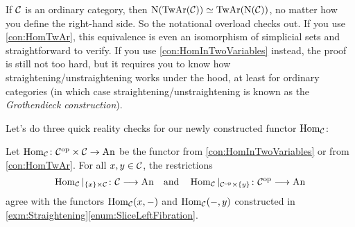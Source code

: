 \begin{rem}\label{rem:TwAr}
	If $\mathcal{C}$ is an ordinary category, then $\operatorname{N}(\operatorname{TwAr}(\mathcal{C}))\simeq \operatorname{TwAr}(\operatorname{N}(\mathcal{C}))$, no matter how you define the right-hand side. So the notational overload checks out. If you use \cref{con:HomTwAr}, this equivalence is even an isomorphism of simplicial sets and straightforward to verify. If you use \cref{con:HomInTwoVariables} instead, the proof is still not too hard, but it requires you to know how straightening/unstraightening works under the hood, at least for ordinary categories (in which case straightening/unstraightening is known as the \emph{Grothendieck construction}). 
\end{rem}
Let's do three quick reality checks for our newly constructed functor $\operatorname{Hom}_{\mathcal{C}}$:
\begin{lem}\label{lem:HomRealityCheck}
	Let $\operatorname{Hom}_{\mathcal{C}}\colon \mathcal{C}^{\mathrm{op}}\times\mathcal{C}\rightarrow\mathrm{An}$ be the functor from \cref{con:HomInTwoVariables} or from \cref{con:HomTwAr}. For all $x,y\in\mathcal{C}$, the restrictions
	\begin{equation*}
		\operatorname{Hom}_{\mathcal{C}}|_{\{x\}\times\mathcal{C}}\colon \mathcal{C}\longrightarrow\mathrm{An}\quad\text{and}\quad \operatorname{Hom}_{\mathcal{C}}|_{\mathcal{C}^{\mathrm{op}}\times\{y\}}\colon \mathcal{C}^{\mathrm{op}}\longrightarrow \mathrm{An}
	\end{equation*}
	agree with the functors $\operatorname{Hom}_{\mathcal{C}}(x,-)$ and $\operatorname{Hom}_{\mathcal{C}}(-,y)$ constructed in \cref{exm:Straightening}\cref{enum:SliceLeftFibration}.
\end{lem}
